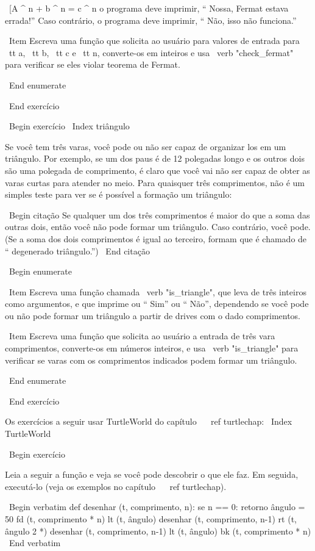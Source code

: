 \documentclass[10pt]{book}
\begin{document}
{{{\ [A ^ n + b ^ n = c ^ n \]
%
o programa deve imprimir, `` Nossa, Fermat estava errada!''
Caso contrário, o programa deve imprimir, `` Não, isso não funciona.''

\ Item Escreva uma função que solicita ao usuário para valores de entrada
para {\ tt a}, {\ tt b}, {\ tt c} e {\ tt n}, converte-os em
inteiros e usa \ verb "check_fermat" para verificar se eles
violar teorema de Fermat.

\ End {enumerate}

\ End {} exercício


\ Begin {} exercício
\ Index {triângulo}

Se você tem três varas, você pode ou não ser capaz de organizar
los em um triângulo. Por exemplo, se um dos paus é de 12 polegadas
longo e os outros dois são uma polegada de comprimento, é claro que você vai
não ser capaz de obter as varas curtas para atender no meio. Para quaisquer
três comprimentos, não é um simples teste para ver se é possível a formação
um triângulo:

\ Begin {citação}
Se qualquer um dos três comprimentos é maior do que a soma das outras
  dois, então você não pode formar um triângulo. Caso contrário, você
  pode. (Se a soma dos dois comprimentos é igual ao terceiro, formam
    que é chamado de `` degenerado triângulo.'')
\ End {citação}

\ Begin {enumerate}

\ Item Escreva uma função chamada \ verb "is_triangle", que leva de três
  inteiros como argumentos, e que imprime ou `` Sim'' ou `` Não'', dependendo
  se você pode ou não pode formar um triângulo a partir de drives com o
  dado comprimentos.

\ Item Escreva uma função que solicita ao usuário a entrada de três vara
  comprimentos, converte-os em números inteiros, e usa \ verb "is_triangle" para
  verificar se varas com os comprimentos indicados podem formar um triângulo.

\ End {enumerate}

\ End {} exercício

Os exercícios a seguir usar TurtleWorld do capítulo ~ \ ref {} turtlechap:
\ Index {} TurtleWorld

\ Begin {} exercício

Leia a seguir a função e veja se você pode descobrir
o que ele faz. Em seguida, executá-lo (veja os exemplos no capítulo ~ \ ref {turtlechap}).

\ Begin {verbatim}
def desenhar (t, comprimento, n):
    se n == 0:
        retorno
    ângulo = 50
    fd (t, comprimento * n)
    lt (t, ângulo)
    desenhar (t, comprimento, n-1)
    rt (t, ângulo 2 *)
    desenhar (t, comprimento, n-1)
    lt (t, ângulo)
    bk (t, comprimento * n)
\ End {verbatim}

}}}
\end{document}
